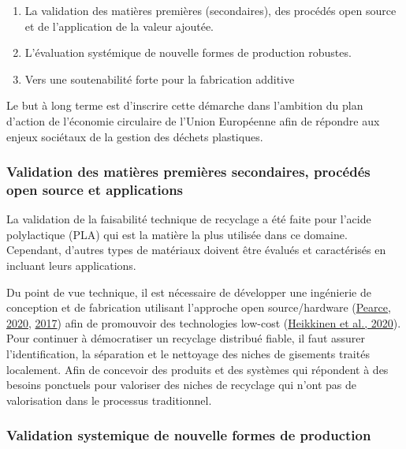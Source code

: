 \documentclass[
  11pt,
]{article}
\providecommand{\tightlist}{%
  \setlength{\itemsep}{0pt}\setlength{\parskip}{0pt}}\usepackage{longtable,booktabs,array}
\begin{document}
\begin{enumerate}
\def\labelenumi{\arabic{enumi}.}
\tightlist
\item
  La validation des matières premières (secondaires), des procédés open
  source et de l'application de la valeur ajoutée.
\item
  L'évaluation systémique de nouvelle formes de production robustes.
\item
  Vers une soutenabilité forte pour la fabrication additive
\end{enumerate}

Le but à long terme est d'inscrire cette démarche dans l'ambition du
plan d'action de l'économie circulaire de l'Union Européenne afin de
répondre aux enjeux sociétaux de la gestion des déchets plastiques.

\hypertarget{validation-des-matiuxe8res-premiuxe8res-secondaires-procuxe9duxe9s-open-source-et-applications}{%
\subsubsection{Validation des matières premières secondaires, procédés
open source et
applications}\label{validation-des-matiuxe8res-premiuxe8res-secondaires-procuxe9duxe9s-open-source-et-applications}}

La validation de la faisabilité technique de recyclage a été faite pour
l'acide polylactique (PLA) qui est la matière la plus utilisée dans ce
domaine. Cependant, d'autres types de matériaux doivent être évalués et
caractérisés en incluant leurs applications.

Du point de vue technique, il est nécessaire de développer une
ingénierie de conception et de fabrication utilisant l'approche open
source/hardware (\protect\hyperlink{ref-Pearce2020a}{Pearce, 2020},
\protect\hyperlink{ref-Pearce2017b}{2017}) afin de promouvoir des
technologies low-cost (\protect\hyperlink{ref-Heikkinen2020a}{Heikkinen
et al., 2020}). Pour continuer à démocratiser un recyclage distribué
fiable, il faut assurer l'identification, la séparation et le nettoyage
des niches de gisements traités localement. Afin de concevoir des
produits et des systèmes qui répondent à des besoins ponctuels pour
valoriser des niches de recyclage qui n'ont pas de valorisation dans le
processus traditionnel.

\hypertarget{validation-systemique-de-nouvelle-formes-de-production}{%
\subsubsection{Validation systemique de nouvelle formes de
production}\label{validation-systemique-de-nouvelle-formes-de-production}}
\end{document}
